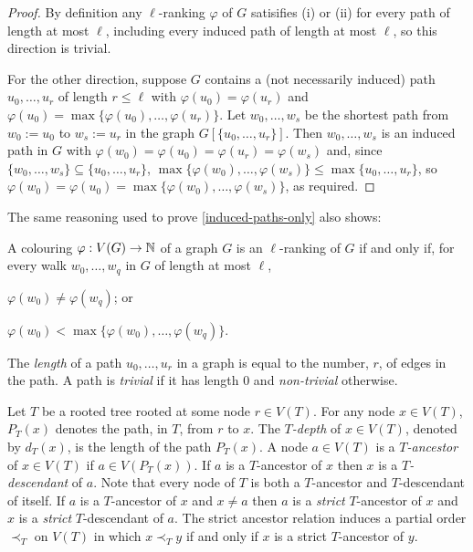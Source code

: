 \documentclass[kpfonts]{patmorin}
\theoremstyle{named}
\begin{document}
\begin{proof}
    By definition any $\ell$-ranking $\varphi$ of $G$ satisifies (i) or (ii) for every path of length at most $\ell$, including every induced path of length at most $\ell$, so this direction is trivial.

    For the other direction, suppose $G$ contains a (not necessarily induced) path $u_0,\ldots,u_r$ of length $r\le\ell$ with $\varphi(u_0)=\varphi(u_r)$ and $\varphi(u_0)=\max\{\varphi(u_0),\ldots,\varphi(u_r)\}$.  Let $w_0,\ldots,w_s$ be the shortest path from $w_0:=u_0$ to $w_s:=u_r$ in  the graph $G[\{u_0,\ldots,u_r\}]$.  Then $w_0,\ldots,w_s$ is an induced path in $G$ with $\varphi(w_0)=\varphi(u_0)=\varphi(u_r)=\varphi(w_s)$ and, since $\{w_0,\ldots,w_{s}\}\subseteq\{u_0,\ldots,u_{r}\}$, $\max\{\varphi(w_0),\ldots,\varphi(w_{s})\}\le\max\{u_0,\ldots,u_{r}\}$, so $\varphi(w_0)=\varphi(u_0)=\max\{\varphi(w_0),\ldots,\varphi(w_s)\}$, as required.
\end{proof}

The same reasoning used to prove \cref{induced-paths-only} also shows:

\begin{obs}\label{walks-too}
    A colouring $\varphi:V(G)\to\mathbb{N}$ of a graph $G$ is an $\ell$-ranking of $G$ if and only if, for every walk $w_0,\ldots,w_q$ in $G$ of length at most $\ell$,
    \begin{inparaenum}[(i)]
        \item $\varphi(w_0)\neq\varphi(w_q)$; or
        \item $\varphi(w_0)<\max\{\varphi(w_0),\ldots,\varphi(w_q)\}$.
    \end{inparaenum}
\end{obs}


The \emph{length} of a path $u_0,\ldots,u_r$ in a graph is equal to the number, $r$, of edges in the path. A path is \emph{trivial} if it has length 0 and \emph{non-trivial} otherwise.

Let $T$ be a rooted tree rooted at some node $r\in V(T)$.  For any node $x\in V(T)$, $P_T(x)$ denotes the path, in $T$, from $r$ to $x$.  The \emph{$T$-depth} of $x\in V(T)$, denoted by $d_T(x)$, is the length of the path $P_T(x)$.  A node $a\in V(T)$ is a \emph{$T$-ancestor} of $x\in V(T)$ if $a\in V(P_T(x))$. If $a$ is a $T$-ancestor of $x$ then $x$ is a \emph{$T$-descendant} of $a$.  Note that every node of $T$ is both a $T$-ancestor and $T$-descendant of itself.  If $a$ is a $T$-ancestor of $x$ and $x\neq a$ then $a$ is a \emph{strict} $T$-ancestor of $x$ and $x$ is a \emph{strict} $T$-descendant of $a$.  The strict ancestor relation induces a partial order $\prec_T$ on $V(T)$ in which $x\prec_T y$ if and only if $x$ is a strict $T$-ancestor of $y$.
\end{document}

